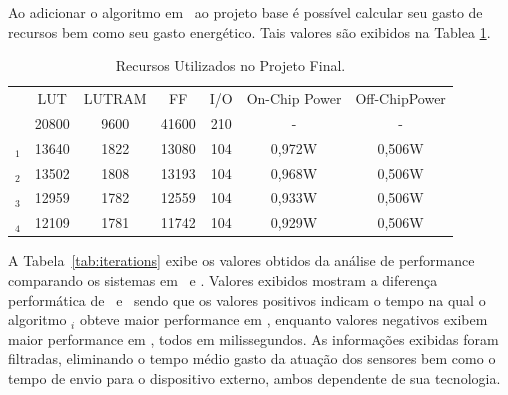    Ao adicionar o algoritmo em \hardware\ ao projeto base é possível calcular seu gasto de recursos bem como seu gasto energético.
    Tais valores são exibidos na Tablea \ref{tab:vivado}.
    \begin{table}[h]\centering
        \vspace{-1em}
        \scriptsize
        \caption{Recursos Utilizados no Projeto Final.}
        \begin{tabular}{rcccccc}
            \toprule
            & LUT    & LUTRAM   & FF     & I/O     & On-Chip Power & Off-ChipPower \\
            \cmidrule{2-7}
            
                  & 20800  & 9600     & 41600  & 210    & -              & -      \\
            \A$_1$& 13640  & 1822     & 13080  & 104    & 0,972W         & 0,506W \\ 
            \A$_2$& 13502  & 1808     & 13193  & 104    & 0,968W         & 0,506W \\ 
            \A$_3$& 12959  & 1782     & 12559  & 104    & 0,933W         & 0,506W \\
            \A$_4$& 12109  & 1781     & 11742  & 104    & 0,929W         & 0,506W \\ 
            \bottomrule
        \end{tabular}
        \label{tab:vivado}
    \end{table}

    A Tabela~\ref{tab:iterations} exibe os valores obtidos da análise de performance comparando os sistemas em \software\ e \hardware. 
    Valores exibidos mostram a diferença performática de \software\ e \hardware\ sendo que os valores positivos indicam o tempo na qual o algoritmo \A$_i$ obteve maior performance em \hardware, enquanto valores negativos exibem maior performance em \software, todos em milissegundos.
    As informações exibidas foram filtradas, eliminando o tempo médio gasto da atuação dos sensores bem como o tempo de envio para o dispositivo externo, ambos dependente de sua tecnologia.

